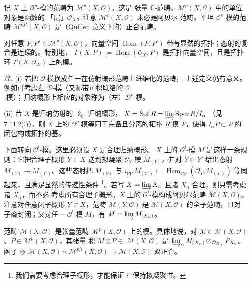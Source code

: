 
记 $X$ 上 $\mathcal{O}^{p}$-模的范畴为 $\mathcal{M}^{p}(X,\mathcal{O})$。这是
张量 $\mathbb{C}$-范畴。$\mathcal{M}^{p}(X,\mathcal{O})$ 中的单位对象是函数的
「层」$\mathcal{O}_X$。注意 $\mathcal{M}^{p}(X,\mathcal{O})$ 未必是阿贝尔
范畴。平坦 $\mathcal{O}^{p}$-模的范畴
$\mathcal{M}^{pfl}(X,\mathcal{O})$ 是（Quillen 意义下的）正合范畴。

对任意 $P,P'\in\mathcal{M}^{p}(X,\mathcal{O})$，向量空间
$\operatorname{Hom}(P,P')$ 带有显然的拓扑；态射的复合是连续的。特别地，
$\Gamma(X,P):=\operatorname{Hom}(\mathcal{O}_X,P)$ 是拓扑向量空间，且是拓扑环
$\Gamma(X,\mathcal{O}_X)$ 上的模。

\emph{注.} (i) 若把 $\mathcal{O}$-模换成任一在仿射概形范畴上纤维化的范畴，
上述定义仍有意义。例如可考虑左 $\mathcal{D}$-模（又称带可积联络的
$\mathcal{O}$-模）；归纳概形上相应的对象称为（左）$\mathcal{D}^{p}$-模。

(ii) 若 $X$ 是归纳仿射的 $\aleph_0$-归纳概形，
$X=\operatorname{Spf}R=\varinjlim\operatorname{Spec}R/I_\alpha$
（见 7.11.2(i)），则 $X$ 上的 $\mathcal{O}^{p}$-模等同于完备且分离的拓扑
$R$-模 $P$，使得 $I_\alpha P\subset P$ 的闭包构成拓扑的基。

 下面转向 $\mathcal{O}^{!}$-模。这里必须设 $X$ 是合理归纳概形。
$X$ 上的 $\mathcal{O}^{!}$-模 $M$ 是这样一条规则：它把合理子概形 $Y\subset X$
送到拟凝聚 $\mathcal{O}_Y$-模 $M_{(Y)}$，并对 $Y\subset Y'$ 给出态射
$M_{(Y)}\to M_{(Y')}$。这些态射把 $M_{(Y)}$ 与
$i^{!}_{YY'}M_{(Y')}:=\operatorname{Hom}_{\mathcal{O}_{Y'}}
(\mathcal{O}_Y,M_{(Y')})$ 等同起来，且满足显然的传递性条件%
\footnote{我们需要考虑合理子概形，才能保证 $i^{!}$ 保持拟凝聚性。}。若写
$X=\varinjlim X_\alpha$ 且诸 $X_\alpha$ 合理，则只需考虑诸 $X_\alpha$，而不必
考虑所有合理子概形。$X$ 上的 $\mathcal{O}^{!}$-模构成阿贝尔范畴
$\mathcal{M}(X,\mathcal{O})$。注意对任意闭子概形 $Y\subset X$，范畴
$\mathcal{M}(Y,\mathcal{O})$ 是 $\mathcal{M}(X,\mathcal{O})$ 的全子范畴，且对
子商封闭；又对任一 $\mathcal{O}^{!}$-模 $M$，有
$M=\varinjlim M_{(X_\alpha)}$。

范畴 $\mathcal{M}(X,\mathcal{O})$ 是张量范畴
$\mathcal{M}^{p}(X,\mathcal{O})$ 上的模。具体地说，对
$M\in\mathcal{M}(X,\mathcal{O})$、$P\in\mathcal{M}^{p}(X,\mathcal{O})$，其张量
积 $M\otimes P\in$
$\mathcal{M}(X,\mathcal{O})$ 是
$\varinjlim_\alpha M_{(X_\alpha)}
\otimes_{\mathcal{O}_{X_\alpha}}P_{X_\alpha}$。函子
$\otimes:\mathcal{M}(X,\mathcal{O})\times
\mathcal{M}^{pfl}(X,\mathcal{O})\to\mathcal{M}(X,\mathcal{O})$ 双正合。

